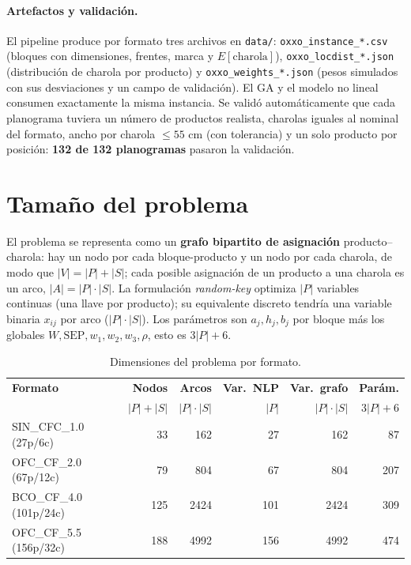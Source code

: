 \documentclass[11pt,letterpaper]{article}
\newcommand{\thead}[1]{\rowcolor{headgray}#1}
\begin{document}
\paragraph{Artefactos y validaci\'on.} El pipeline produce por formato tres archivos
en \texttt{data/}: \texttt{oxxo\_instance\_*.csv} (bloques con dimensiones, frentes,
marca y $E[\text{charola}]$), \texttt{oxxo\_locdist\_*.json} (distribuci\'on de
charola por producto) y \texttt{oxxo\_weights\_*.json} (pesos simulados con sus
desviaciones y un campo de validaci\'on). El GA y el modelo no lineal consumen
exactamente la misma instancia. Se valid\'o autom\'aticamente que cada planograma
tuviera un n\'umero de productos realista, charolas iguales al nominal del formato,
ancho por charola $\le 55$ cm (con tolerancia) y un solo producto por posici\'on:
\textbf{132 de 132 planogramas} pasaron la validaci\'on.

\section{Tama\~no del problema}
El problema se representa como un \textbf{grafo bipartito de asignaci\'on}
producto--charola: hay un nodo por cada bloque-producto y un nodo por cada charola,
de modo que $|V|=|P|+|S|$; cada posible asignaci\'on de un producto a una charola es
un arco, $|A|=|P|\cdot|S|$. La formulaci\'on \emph{random-key} optimiza $|P|$
variables continuas (una llave por producto); su equivalente discreto tendr\'ia una
variable binaria $x_{ij}$ por arco ($|P|\cdot|S|$). Los par\'ametros son
$a_j,h_j,b_j$ por bloque m\'as los globales $W,\text{SEP},w_1,w_2,w_3,\rho$, esto es
$3|P|+6$.

\begin{table}[H]
\centering\small
\begin{tabular}{lrrrrr}
\toprule
\thead{\textbf{Formato}} & \textbf{Nodos} & \textbf{Arcos} &
\textbf{Var.\ NLP} & \textbf{Var.\ grafo} & \textbf{Par\'am.} \\
& {\small$|P|+|S|$} & {\small$|P|\cdot|S|$} & {\small$|P|$} &
{\small$|P|\cdot|S|$} & {\small$3|P|+6$} \\
\midrule
SIN\_CFC\_1.0 \,(27p/6c)   & 33  & 162  & 27  & 162  & 87  \\
OFC\_CF\_2.0 \,(67p/12c)   & 79  & 804  & 67  & 804  & 207 \\
BCO\_CF\_4.0 \,(101p/24c)  & 125 & 2424 & 101 & 2424 & 309 \\
OFC\_CF\_5.5 \,(156p/32c)  & 188 & 4992 & 156 & 4992 & 474 \\
\bottomrule
\end{tabular}
\caption{Dimensiones del problema por formato.}
\label{tab:size}
\end{table}
\end{document}
